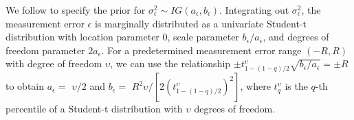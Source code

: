 We follow \citet{Fong2010} to specify the prior for 
$\sigma_{\epsilon}^2\sim IG(a_{\epsilon},b_{\epsilon})$. Integrating 
out $\sigma_{\epsilon}^2$, the measurement error $\epsilon$ is marginally 
distributed as a univariate Student-t distribution with location parameter 0, scale 
parameter $b_{\epsilon}/a_{\epsilon}$, and degrees of freedom parameter $2a_{\epsilon}$. 
For a predetermined measurement error range $(-R,R)$ with degree of freedom $\upsilon$, 
we can use the relationship $\pm t_{1-(1-q)/2}^{\upsilon}\sqrt{b_{\epsilon}/a_{\epsilon}}=\pm R$ 
to obtain $a_{\epsilon}=$ $\upsilon/2$ and $b_{\epsilon}=$
$R^2\upsilon/[2(t_{1-(1-q)/2}^{\upsilon})^2]$, where $t^{\upsilon}_q$ is the 
$q$-th percentile of a Student-t distribution with $\upsilon$ degrees of freedom. 




